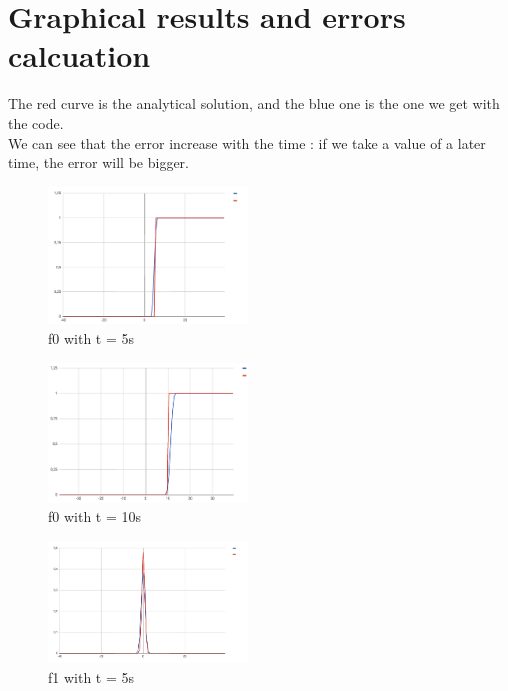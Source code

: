 \documentclass{report}
\begin{document}
                        \section{Graphical results and errors calcuation}
                        The red curve is the analytical solution, and the blue one is the one we get with the code. \\
                        We can see that the error increase with the time : if we take a value of a later time, the error will be bigger.
                        \begin{figure}[h]
                            \begin{center}
                            \includegraphics[width = 200px]{f0/t5/res.png} 
                            \end{center}
                            \caption{f0 with t = 5s}
                        \end{figure}
                        \begin{figure}[!h]
                            \begin{center}
                                \includegraphics[width = 200px]{f0/t10/res.png} 
                            \end{center}
                            \caption{f0 with t = 10s}
                        \end{figure}
                        
                        \begin{figure}[!h]
                            \begin{center}
                            \includegraphics[width = 200px]{f1/t5/res.png} 
                            \end{center}
                            \caption{f1 with t = 5s}
                        \end{figure}
                        
\end{document}

